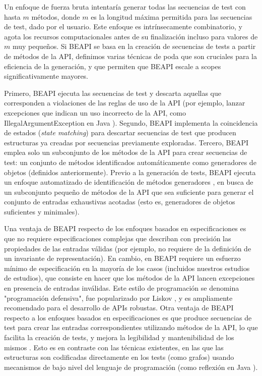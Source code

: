 Un enfoque de fuerza bruta intentaría generar todas las secuencias de test con
hasta $m$ métodos, donde $m$ es la longitud máxima permitida para las secuencias de test, 
dado por el usuario. Este enfoque es intrínsecamente combinatorio, y agota los recursos 
computacionales antes de su finalización incluso para valores de $m$ muy pequeños. 
Si BEAPI se basa en la creación de secuencias de tests a partir de métodos de la
API, definimos varias técnicas de poda que son cruciales para la eficiencia de
la generación, y que permiten que BEAPI escale a scopes significativamente mayores. 

Primero, BEAPI ejecuta las secuencias de test y descarta aquellas que corresponden 
a violaciones de las reglas de uso de la API \cite{Pacheco07} (por ejemplo, lanzar 
excepciones que indican un uso incorrecto de la API, como IllegalArgumentException en 
Java \cite{Liskov00, Pacheco07}). 
Segundo, BEAPI implementa la coincidencia de estados (\emph{state matching})
\cite{Iosif02, Politano20, Xie04} para descartar secuencias de test que
producen estructuras ya creadas por secuencias previamente exploradas. 
Tercero, BEAPI emplea solo un subconjunto de los métodos de la API para crear
secuencias de test: un conjunto de métodos identificados automáticamente como
generadores de objetos \cite{Ponzio19} (definidos anteriormente). 
Previo a la generación de tests, BEAPI ejecuta un enfoque automatizado de
identificación de métodos generadores \cite{Ponzio19}, en busca de un
subconjunto pequeño de métodos de la API que sea suficiente para generar el conjunto 
de entradas exhaustivas acotadas (esto es, generadores de objetos suficientes y
minimales). 

Una ventaja de BEAPI respecto de los enfoques basados en especificaciones es que
no requiere especificaciones complejas que describan con precisión las
propiedades de las entradas válidas (por ejemplo, no requiere de la definición
de un invariante de representación). En cambio, en BEAPI 
requiere un esfuerzo mínimo de especificación en la mayoría de los casos (incluidos nuestros estudios de estudios), que consiste en 
hacer que los métodos de la API lancen excepciones en presencia de entradas
inválidas. Este estilo de programación se denomina "programación defensiva", 
fue popularizado por Liskov \cite{Liskov00}, y es ampliamente recomendado para el desarrollo de APIs robustas. 
Otra ventaja de BEAPI respecto a los enfoques basados en especificaciones es que produce secuencias de test para crear las entradas correspondientes utilizando métodos de la API, lo que facilita la creación de tests, y mejora la legibilidad y mantenibilidad de los mismos \cite{Braione17}. Esto es en contraste con las técnicas existentes, en las que las estructuras son codificadas directamente en los tests (como grafos) usando mecanismos de bajo nivel del lenguaje de programación (como reflexión en Java \cite{landman2017}).


